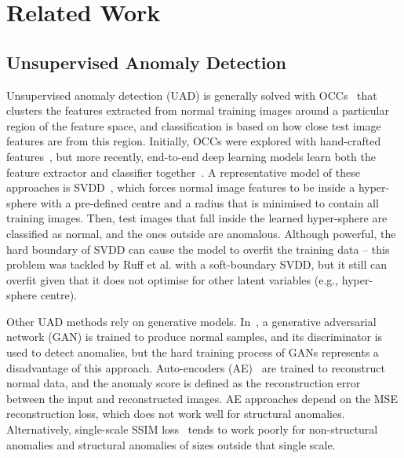 \documentclass[final]{cvpr}
\begin{document}
\section{Related Work}






\subsection{Unsupervised Anomaly Detection} 
\label{sec:unsupervised_anomaly_detection}

Unsupervised anomaly detection (UAD) is generally solved with OCCs~\cite{scholkopf2000support} that clusters the features extracted from normal training images around a particular region of the feature space, and classification is based on how close test image features are from this region. 
Initially, OCCs were explored with hand-crafted features~\cite{medioni2001event,basharat2008learning,wang2014learning,zhang2009learning}, but more recently, end-to-end deep learning models learn both the feature extractor and classifier together~\cite{dsvdd,Markovitz_2020_CVPR,bergmann2020uninformed,Park_2020_CVPR,morais2019learning,lsa,ocgan,bergman2020classification,zhou2020encoding,golan2018deep,wang2019gods,del2016discriminative,Cheng_2015_CVPR,Park_2020_CVPR}. 
A representative model of these approaches is  SVDD~\cite{svdd}, which forces normal image features to be inside a hyper-sphere with a pre-defined centre and a radius that is minimised to contain all training images. Then, test images that fall inside the learned hyper-sphere are classified as normal, and the ones outside are anomalous.
Although powerful, the hard boundary of SVDD can cause the model to overfit the training data -- this problem was tackled by Ruff et al.\cite{dsvdd} with a soft-boundary SVDD, but it still can overfit given that it does not optimise for other latent variables (e.g., hyper-sphere centre).


Other UAD methods rely on generative models.
In~\cite{ocgan}, a generative adversarial network (GAN) is trained to produce normal samples, and its discriminator is used to detect anomalies, but the hard training process of GANs represents a disadvantage of this approach.
Auto-encoders (AE)~\cite{liu2018future,ren2015unsupervised,xu2015learning,ionescu2019object,gong2019memorizing,nguyen2019anomaly,sabokrou2017deep,sabokrou2018adversarially,Burlina_2019_CVPR,venkataramanan2019attention,zong2018deep} are trained to reconstruct normal data, and the anomaly score is defined as the reconstruction error between the input and reconstructed images.  AE approaches depend on the MSE reconstruction loss, which does not work well for structural anomalies.  Alternatively, single-scale SSIM loss~\cite{ae-ssim} tends to work poorly for non-structural anomalies and structural anomalies of sizes outside that single scale.  
\end{document}

